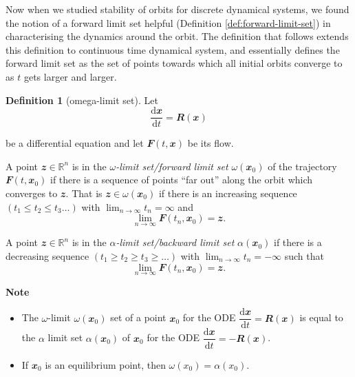 \documentclass[
  a4paper,
  oneside,
  final]{krantz}
\providecommand{\tightlist}{%
  \setlength{\itemsep}{0pt}\setlength{\parskip}{0pt}}
\newcommand{\R}{\mathbb{R}}
\renewcommand{\d}{\mathrm{d}}
\renewcommand{\v}[1]{{\mathbfit{#1}}}
\newcommand{\der}[2]{\dfrac{\d #1}{\d #2}}
\theoremstyle{definition}
\newtheorem{definition}{Definition}[chapter]
\theoremstyle{definition}
\theoremstyle{definition}
\theoremstyle{definition}
\theoremstyle{remark}
\begin{document}
Now when we studied stability of orbits for discrete dynamical systems, we found the notion of a forward limit set helpful (Definition \ref{def:forward-limit-set}) in characterising the dynamics around the orbit. The definition that follows extends this definition to continuous time dynamical system, and essentially defines the forward limit set as the set of points towards which all initial orbits converge to as \(t\) gets larger and larger.

\begin{definition}[omega-limit set]
\protect\hypertarget{def:forward-limit-set-cont}{}\label{def:forward-limit-set-cont}Let
\[\der{\v{x}}{t} = \v{R}(\v{x})\]

be a differential equation and let \(\v{F}(t,\v{x})\) be its flow.

A point \(\v{z} \in \R^{n}\) is in the \emph{\(\omega\)-limit set/forward limit set} \(\omega(\v{x}_0)\) of the trajectory \(\v{F}(t,\v{x}_0)\) if there is a sequence of points ``far out'' along the orbit which converges to \(\v{z}\). That is \(\v{z}\in \omega(\v{x}_0)\) if there is an increasing sequence \((t_1 \le t_2 \le t_3 \ldots )\) with \(\lim_{n \to \infty} t_n = \infty\) and
\[\lim_{n \to \infty} \v{F}(t_n,\v{x}_0) = \v{z}.\]

A point \(\v{z} \in \R^{n}\) is in the \emph{\(\alpha\)-limit set/backward limit set} \(\alpha(\v{x}_0)\) if there is a decreasing sequence \((t_1 \ge t_2 \ge t_3 \ge \ldots)\) with \(\lim_{n \to \infty} t_n = -\infty\) such that
\[ \lim_{n\to \infty} \v{F}(t_n, \v{x}_0) = \v{z}.\]
\end{definition}

\begin{palegreenbox}

\begin{center}
\textbf{Note}

\end{center}

\begin{itemize}
\tightlist
\item
  The \(\omega\)-limit \(\omega(\v{x}_0)\) set of a point \(\v{x}_0\) for the ODE \(\der{\v{x}}{t} = \v{R}(\v{x})\) is equal to the \(\alpha\) limit set \(\alpha(\v{x}_0)\) of \(\v{x}_0\) for the ODE \(\der{\v{x}}{t} = -\v{R}(\v{x})\).
\item
  If \(\v{x}_{0}\) is an equilibrium point, then \(\omega(x_0) = \alpha(x_0)\).
\end{itemize}

\end{palegreenbox}
\end{document}
